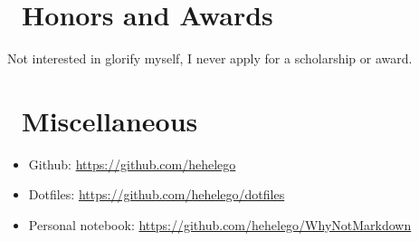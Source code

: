 \documentclass{resume}
\begin{document}
\section{\faHeart[regular]\ Honors and Awards}
Not interested in glorify myself, I never apply for a scholarship or award.

\section{\faInfo\ Miscellaneous}
\begin{itemize}[parsep=0.5ex]
	\item Github: \url{https://github.com/hehelego}
	\item Dotfiles: \url{https://github.com/hehelego/dotfiles}
	\item Personal notebook: \url{https://github.com/hehelego/WhyNotMarkdown}
\end{itemize}
\end{document}
